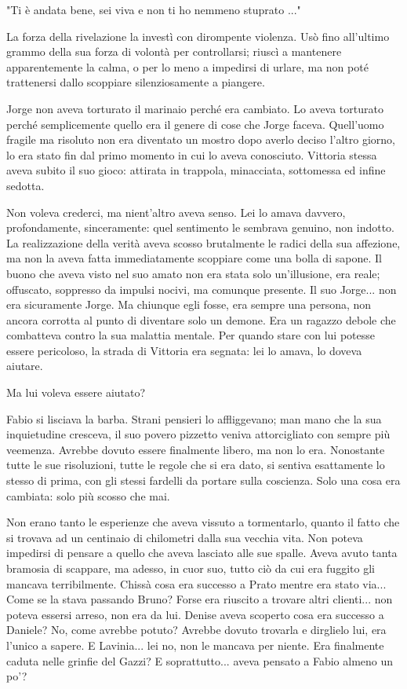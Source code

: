 "Ti è andata bene, sei viva e non ti ho nemmeno stuprato ..."

La forza della rivelazione la investì con dirompente violenza. Usò fino all'ultimo grammo della sua forza di volontà per controllarsi; riuscì a mantenere apparentemente la calma, o per lo meno a impedirsi di urlare, ma non poté trattenersi dallo scoppiare silenziosamente a piangere.

Jorge non aveva torturato il marinaio perché era cambiato. Lo aveva torturato perché semplicemente quello era il genere di cose che Jorge faceva. Quell'uomo fragile ma risoluto non era diventato un mostro dopo averlo deciso l'altro giorno, lo era stato fin dal primo momento in cui lo aveva conosciuto. Vittoria stessa aveva subito il suo gioco: attirata in trappola, minacciata, sottomessa ed infine sedotta.

Non voleva crederci, ma nient'altro aveva senso. Lei lo amava davvero, profondamente, sinceramente: quel sentimento le sembrava genuino, non indotto. La realizzazione della verità aveva scosso brutalmente le radici della sua affezione, ma non la aveva fatta immediatamente scoppiare come una bolla di sapone. Il buono che aveva visto nel suo amato non era stata solo un'illusione, era reale; offuscato, soppresso da impulsi nocivi, ma comunque presente. Il suo Jorge... non era sicuramente Jorge. Ma chiunque egli fosse, era sempre una persona, non ancora corrotta al punto di diventare solo un demone. Era un ragazzo debole che combatteva contro la sua malattia mentale. Per quando stare con lui potesse essere pericoloso, la strada di Vittoria era segnata: lei lo amava, lo doveva aiutare.

Ma lui voleva essere aiutato?

Fabio si lisciava la barba. Strani pensieri lo affliggevano; man mano che la sua inquietudine cresceva, il suo povero pizzetto veniva attorcigliato con sempre più veemenza. Avrebbe dovuto essere finalmente libero, ma non lo era. Nonostante tutte le sue risoluzioni, tutte le regole che si era dato, si sentiva esattamente lo stesso di prima, con gli stessi fardelli da portare sulla coscienza. Solo una cosa era cambiata: solo più scosso che mai.

Non erano tanto le esperienze che aveva vissuto a tormentarlo, quanto il fatto che si trovava ad un centinaio di chilometri dalla sua vecchia vita. Non poteva impedirsi di pensare a quello che aveva lasciato alle sue spalle. Aveva avuto tanta bramosia di scappare, ma adesso, in cuor suo, tutto ciò da cui era fuggito gli mancava terribilmente. Chissà cosa era successo a Prato mentre era stato via... Come se la stava passando Bruno? Forse era riuscito a trovare altri clienti... non poteva essersi arreso, non era da lui. Denise aveva scoperto cosa era successo a Daniele? No, come avrebbe potuto? Avrebbe dovuto trovarla e dirglielo lui, era l'unico a sapere. E Lavinia... lei no, non le mancava per niente. Era finalmente caduta nelle grinfie del Gazzi? E soprattutto... aveva pensato a Fabio almeno un po'?

